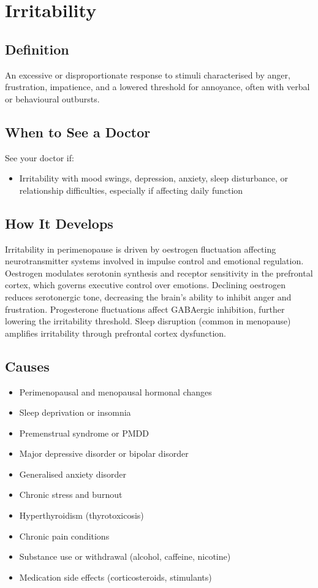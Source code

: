 \chapter{Irritability}

\section*{Definition}
An excessive or disproportionate response to stimuli characterised by anger, frustration, impatience, and a lowered threshold for annoyance, often with verbal or behavioural outbursts.

\section*{When to See a Doctor}
See your doctor if:
\begin{itemize}
  \item Irritability with mood swings, depression, anxiety, sleep disturbance, or relationship difficulties, especially if affecting daily function
\end{itemize}

\section*{How It Develops}
Irritability in perimenopause is driven by oestrogen fluctuation affecting neurotransmitter systems involved in impulse control and emotional regulation. Oestrogen modulates serotonin synthesis and receptor sensitivity in the prefrontal cortex, which governs executive control over emotions. Declining oestrogen reduces serotonergic tone, decreasing the brain's ability to inhibit anger and frustration. Progesterone fluctuations affect GABAergic inhibition, further lowering the irritability threshold. Sleep disruption (common in menopause) amplifies irritability through prefrontal cortex dysfunction.

\section*{Causes}
\begin{itemize}
  \item Perimenopausal and menopausal hormonal changes
  \item Sleep deprivation or insomnia
  \item Premenstrual syndrome or PMDD
  \item Major depressive disorder or bipolar disorder
  \item Generalised anxiety disorder
  \item Chronic stress and burnout
  \item Hyperthyroidism (thyrotoxicosis)
  \item Chronic pain conditions
  \item Substance use or withdrawal (alcohol, caffeine, nicotine)
  \item Medication side effects (corticosteroids, stimulants)
\end{itemize}

